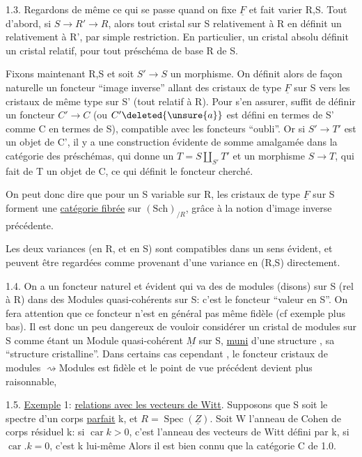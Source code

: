 
1.3. Regardons de même ce qui se passe quand on fixe $\underline F$ et fait varier R,S. Tout d'abord, si $S\to R'\to R$, alors tout cristal sur S relativement à R en définit un  relativement à R', par simple restriction. En particulier, un cristal absolu définit un cristal relatif, pour tout préschéma de base R de S.

Fixons maintenant R,S et soit $S'\to S$ un morphisme. On définit alors de façon naturelle un foncteur ``image inverse'' allant des cristaux de type $\underline F$ sur S vers les cristaux de même type sur S' (tout relatif à R). Pour s'en assurer,  suffit de définir un foncteur $C'\longrightarrow C$ (ou $C'\deleted{\unsure{a}}$ est défini en termes de S' comme C en termes de S), compatible avec les foncteurs ``oubli''. Or si $S'\longrightarrow T'$ est un objet de C', il y a une construction évidente de somme amalgamée dans la catégorie des préschémas, qui donne un $T=S\amalg_{S'}T'$ et un morphisme $S\longrightarrow T$, qui fait de T un objet de C, ce qui définit le foncteur cherché.

On peut donc dire que pour un S variable sur R, les cristaux de type $\underline F$ sur S forment une \uline{catégorie fibrée} sur $(\mathrm{Sch})_{/R}$, grâce à la notion d'image inverse précédente.

Les deux variances (en R, et en S) sont compatibles dans un sens évident, et peuvent être regardées comme provenant d'une variance en (R,S) directement.

1.4. On a un foncteur naturel et évident qui va des  de modules (disons) sur S (rel à R) dans des Modules quasi-cohérents sur S: c'est le foncteur ``valeur en S''. On fera attention que ce foncteur n'est en général pas même fidèle (cf exemple  plus bas). Il est donc un peu dangereux de vouloir considérer un cristal de modules sur S comme étant un Module quasi-cohérent $\underline M$ sur S, \uline{muni} d'une structure , sa ``structure cristalline''. Dans certains cas cependant , le foncteur cristaux de modules $\rightsquigarrow$Modules est fidèle et le point de vue précédent devient plus raisonnable,

1.5. \uline{Exemple} 1: \uline{relations avec les vecteurs de Witt}. Supposons que S soit le spectre d'un corps \uline{parfait}  k, et $R=\operatorname{Spec}(\underline Z)$. Soit W l'anneau de Cohen de corps résiduel k: si $\operatorname{car}k>0$, c'est l'anneau des vecteurs de Witt défini par k, si $\operatorname{car}.k=0$, c'est k lui-même Alors il est bien connu que la catégorie C de 1.0.
